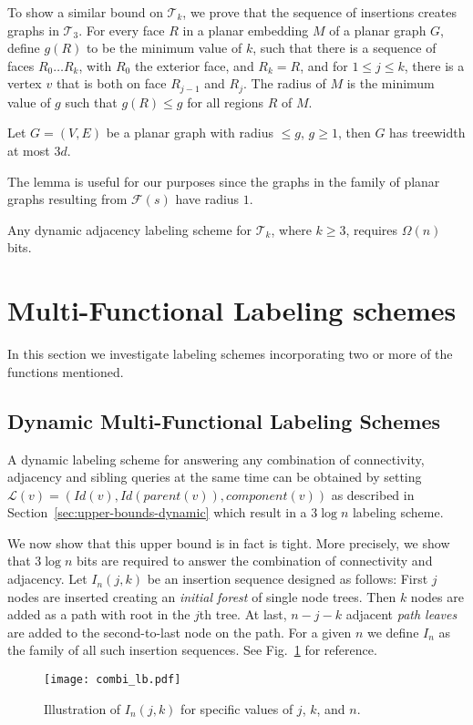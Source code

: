 \documentclass{llncs}
\newcommand{\la}{\ensuremath{ \mathcal{L}}}
\begin{document}
To show a similar bound on $\mathcal{T}_k$, we prove  that the sequence of insertions creates graphs in $\mathcal{T}_3$.
For every face $R$ in  a planar embedding $M$ of a  planar graph $G$, define
$g(R)$ to be the minimum value of $k$, such that there is a sequence of faces
$R_0 \dots R_k$, with $R_0$ the exterior face, and $R_k = R$, and for $1 \leq j
\leq k$, there is a vertex $v$ that is both on face $R_{j-1}$ and $R_{j}$. The
radius of $M$ is the minimum value of $g$ such that $g(R) \leq g$ for all
regions $R$ of $M$.
\begin{lemma}\cite{bodlaender1988dynamic}\label{lemma:bodlander}
Let $G=(V,E)$ be a planar graph with radius $\leq g$, $ g \geq 1$, then $G$ has treewidth at most $3d$.
\end{lemma}
The lemma is useful for our purposes since  the graphs in the  family of  planar graphs resulting from  $\mathcal{F}(s)$ have radius $1$.
\begin{corollary}
 Any dynamic adjacency labeling scheme for $\mathcal{T}_k$, where  $k \geq 3$, requires $\Omega(n)$ bits.
\end{corollary}

\section{Multi-Functional Labeling schemes}
In this section we investigate labeling schemes incorporating  two or more of the functions mentioned.
\subsection{Dynamic Multi-Functional Labeling Schemes}
A dynamic labeling scheme for answering any combination of connectivity, adjacency and sibling queries at the same time can be obtained by setting  $\la(v) = (Id(v), Id(parent(v)), component(v))$ as described in Section~\ref{sec:upper-bounds-dynamic}  which result in a $3 \log n$ labeling scheme.

 We  now show that this upper bound is in fact is tight.
 More precisely, we show that $3\log n$ bits are required to answer  the combination of connectivity and adjacency.
  Let $I_n(j,k)$ be an insertion sequence designed as follows: First $j$ nodes are inserted creating an \emph{initial
forest} of single node trees. Then $k$ nodes are added as a path with root in
the $j$th tree. At last, $n-j-k$ adjacent \emph{path leaves} are added to the
second-to-last node on the path. For a given $n$ we define $I_n$ as the family
of all such insertion sequences. See Fig.~\ref{fig:combi_lb} for reference.
\begin{figure}[h]
    \centering
    \texttt{[image: combi\_lb.pdf]}
    \caption{Illustration of $I_n(j,k)$ for specific values of $j$, $k$, and
    $n$.}
    \label{fig:combi_lb}
\end{figure}
\end{document}
